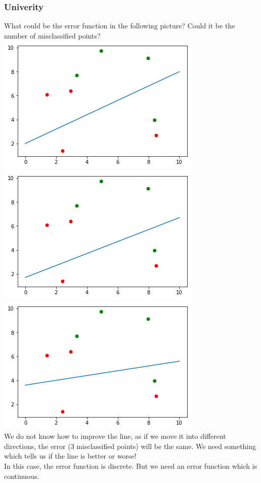 \begin{frame}[fragile]
  \frametitle{Univerity}
  What could be the error function in the following picture? Could it be the number
  of misclassified points?\\
  \vspace{3mm}
  \includegraphics[scale=0.25]{img/error_1}
  \includegraphics[scale=0.25]{img/error_2}
  \includegraphics[scale=0.25]{img/error_3}\\
  \vspace{3mm}
  We do not know how to improve the line, as if we move it into different
  directions, the error (3 misclassified points) will be the same. We need
  something which tells us if the line is better or worse!\\
  In this case, the error function is discrete. But we need an error function
  which is continuous.
\end{frame}

